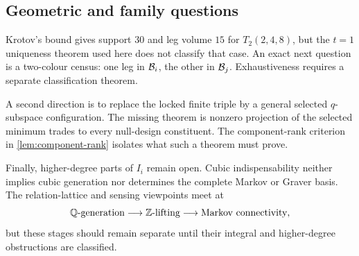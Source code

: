 \subsection{Geometric and family questions}

Krotov's bound gives support \(30\) and leg volume \(15\) for
\(T_2(2,4,8)\), but the \(t=1\) uniqueness theorem used here does not
classify that case.  An exact next question is a two-colour census: one
leg in \(\mathcal B_i\), the other in \(\mathcal B_j\).  Exhaustiveness requires a
separate classification theorem.

A second direction is to replace the locked finite triple by a general
selected \(q\)-subspace configuration.  The missing theorem is nonzero
projection of the selected minimum trades to every null-design
constituent.  The component-rank criterion in
\cref{lem:component-rank} isolates what such a theorem must prove.

Finally, higher-degree parts of \(I_i\) remain open.  Cubic
indispensability neither implies cubic generation nor determines the
complete Markov or Graver basis.  The relation-lattice and sensing viewpoints
meet at
\[
 \mathbb Q\text{-generation}\longrightarrow
 \mathbb Z\text{-lifting}\longrightarrow
 \text{Markov connectivity},
\]
but these stages should remain separate until their integral and
higher-degree obstructions are classified.
